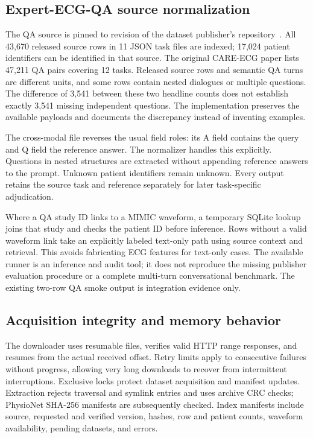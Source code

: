 \documentclass[11pt,a4paper]{article}
\newcommand{\code}[1]{\texttt{\detokenize{#1}}}
\begin{document}
\subsection{Expert-ECG-QA source normalization}
The QA source is pinned to revision \code{4fcb46974eed422532772caa483a5e621f006ff1} of the dataset publisher's repository~\cite{qa_repo,qa}. All 43,670 released source rows in 11 JSON task files are indexed; 17,024 patient identifiers can be identified in that source. The original CARE-ECG paper lists 47,211 QA pairs covering 12 tasks. Released source rows and semantic QA turns are different units, and some rows contain nested dialogues or multiple questions. The difference of 3,541 between these two headline counts does not establish exactly 3,541 missing independent questions. The implementation preserves the available payloads and documents the discrepancy instead of inventing examples.

\begin{table}[htbp]\centering\small

\caption{Complete released QA source-row inventory for the pinned revision. These are acquisition counts, not successfully answered or scored questions.}
\label{tab:qa}\end{table}

The cross-modal file reverses the usual field roles: its A field contains the query and Q field the reference answer. The normalizer handles this explicitly. Questions in nested structures are extracted without appending reference answers to the prompt. Unknown patient identifiers remain unknown. Every output retains the source task and reference separately for later task-specific adjudication.

Where a QA study ID links to a MIMIC waveform, a temporary SQLite lookup joins that study and checks the patient ID before inference. Rows without a valid waveform link take an explicitly labeled text-only path using source context and retrieval. This avoids fabricating ECG features for text-only cases. The available runner is an inference and audit tool; it does not reproduce the missing publisher evaluation procedure or a complete multi-turn conversational benchmark. The existing two-row QA smoke output is integration evidence only.

\subsection{Acquisition integrity and memory behavior}
The downloader uses resumable \code{.zip.part} files, verifies valid HTTP range responses, and resumes from the actual received offset. Retry limits apply to consecutive failures without progress, allowing very long downloads to recover from intermittent interruptions. Exclusive locks protect dataset acquisition and manifest updates. Extraction rejects traversal and symlink entries and uses archive CRC checks; PhysioNet SHA-256 manifests are subsequently checked. Index manifests include source, requested and verified version, hashes, row and patient counts, waveform availability, pending datasets, and errors.
\end{document}
